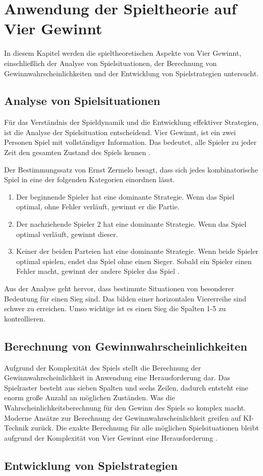 \chapter{Anwendung der Spieltheorie auf Vier Gewinnt}
\label{cha:nwendung der Spieltheorie auf Vier Gewinnt}
In diesem Kapitel werden die spieltheoretischen Aspekte von Vier Gewinnt, einschließlich der Analyse von Spielsituationen, der Berechnung von Gewinnwahrscheinlichkeiten und der Entwicklung von Spielstrategien untersucht.


\section{Analyse von Spielsituationen}
\label{sec:Analyse von Spielsituationen}
Für das Verständnis der Spieldynamik und die Entwicklung effektiver Strategien, ist die Analyse der Spielsituation entscheidend.
Vier Gewinnt, ist ein zwei Personen Spiel mit vollständiger Information. Das bedeutet, alle Spieler zu jeder Zeit den gesamten Zustand des Spiels kennen \autocite{ruile2009viergewinnt}.

Der Bestimmungssatz von Ernst Zermelo besagt, dass sich jedes kombinatorische Spiel in eine der folgenden Kategorien einordnen lässt.
\begin{enumerate}
	\item  Der beginnende Spieler hat eine dominante Strategie. Wenn das Spiel optimal, ohne Fehler verläuft, gewinnt er die Partie.
	\item Der nachziehende Spieler 2 hat eine dominante Strategie. Wenn das Spiel optimal verläuft, gewinnt dieser.
	\item Keiner der beiden Parteien hat eine dominante Strategie. Wenn beide Spieler optimal spielen, endet das Spiel ohne einen Sieger. Sobald ein Spieler einen Fehler macht, gewinnt der andere Spieler das Spiel \autocite{mueller_2011}.
\end{enumerate}

Aus der Analyse geht hervor, dass bestimmte Situationen von besonderer Bedeutung für einen Sieg sind.
Das bilden einer horizontalen Viererreihe sind schwer zu erreichen. Umso wichtige ist es einen Sieg die Spalten 1-5 zu kontrollieren. 


\section{Berechnung von Gewinnwahrscheinlichkeiten}
Aufgrund der Komplexität des Spiels stellt die Berechnung der Gewinnwahrscheinlichkeit in Anwendung eine Herausforderung dar. Das Spielraster besteht aus sieben Spalten und sechs Zeilen, dadurch entsteht eine enorm große Anzahl an möglichen Zuständen. Was die Wahrscheinlichkeitsberechnung für den Gewinn des Spiels so komplex macht.
Moderne Ansätze zur Berechnung der Gewinnwahrscheinlichkeit greifen auf KI-Technik zurück. Die exakte Berechnung für alle möglichen Spielsituationen bleibt aufgrund der Komplexität von Vier Gewinnt eine Herausforderung \autocite{ruile2009viergewinnt}.
\section{Entwicklung von Spielstrategien}
	